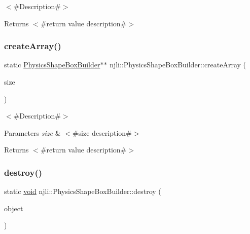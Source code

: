 $<$\#\+Description\#$>$

\begin{DoxyReturn}{Returns}
$<$\#return value description\#$>$ 
\end{DoxyReturn}
\mbox{\label{classnjli_1_1_physics_shape_box_builder_a4c31be2ff7f17fea5aad2dfc74f35e19}} 
\subsubsection{\texorpdfstring{create\+Array()}{createArray()}}
{\footnotesize\ttfamily static \mbox{\hyperlink{classnjli_1_1_physics_shape_box_builder}{Physics\+Shape\+Box\+Builder}}$\ast$$\ast$ njli\+::\+Physics\+Shape\+Box\+Builder\+::create\+Array (\begin{DoxyParamCaption}\item[{const \mbox{\hyperlink{_util_8h_a10e94b422ef0c20dcdec20d31a1f5049}{u32}}}]{size }\end{DoxyParamCaption})\hspace{0.3cm}{\ttfamily [static]}}

$<$\#\+Description\#$>$


\begin{DoxyParams}{Parameters}
{\em size} & $<$\#size description\#$>$\\
\hline
\end{DoxyParams}
\begin{DoxyReturn}{Returns}
$<$\#return value description\#$>$ 
\end{DoxyReturn}
\mbox{\label{classnjli_1_1_physics_shape_box_builder_ae6b9fe92a84c38262a12ae92d30a04c6}} 
\subsubsection{\texorpdfstring{destroy()}{destroy()}}
{\footnotesize\ttfamily static \mbox{\hyperlink{_thread_8h_af1e856da2e658414cb2456cb6f7ebc66}{void}} njli\+::\+Physics\+Shape\+Box\+Builder\+::destroy (\begin{DoxyParamCaption}\item[{\mbox{\hyperlink{classnjli_1_1_physics_shape_box_builder}{Physics\+Shape\+Box\+Builder}} $\ast$}]{object }\end{DoxyParamCaption})\hspace{0.3cm}{\ttfamily [static]}}

